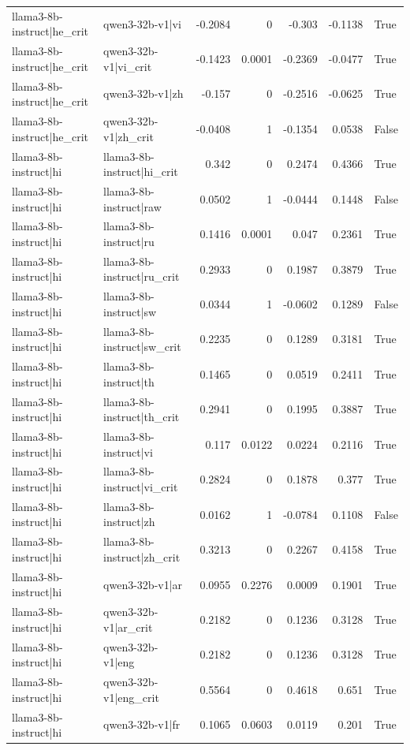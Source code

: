 \begin{table}
\begin{tabular}{l l r r r r l}
llama3-8b-instruct|he_crit & qwen3-32b-v1|vi & -0.2084 & 0 & -0.303 & -0.1138 & True \\
llama3-8b-instruct|he_crit & qwen3-32b-v1|vi_crit & -0.1423 & 0.0001 & -0.2369 & -0.0477 & True \\
llama3-8b-instruct|he_crit & qwen3-32b-v1|zh & -0.157 & 0 & -0.2516 & -0.0625 & True \\
llama3-8b-instruct|he_crit & qwen3-32b-v1|zh_crit & -0.0408 & 1 & -0.1354 & 0.0538 & False \\
llama3-8b-instruct|hi & llama3-8b-instruct|hi_crit & 0.342 & 0 & 0.2474 & 0.4366 & True \\
llama3-8b-instruct|hi & llama3-8b-instruct|raw & 0.0502 & 1 & -0.0444 & 0.1448 & False \\
llama3-8b-instruct|hi & llama3-8b-instruct|ru & 0.1416 & 0.0001 & 0.047 & 0.2361 & True \\
llama3-8b-instruct|hi & llama3-8b-instruct|ru_crit & 0.2933 & 0 & 0.1987 & 0.3879 & True \\
llama3-8b-instruct|hi & llama3-8b-instruct|sw & 0.0344 & 1 & -0.0602 & 0.1289 & False \\
llama3-8b-instruct|hi & llama3-8b-instruct|sw_crit & 0.2235 & 0 & 0.1289 & 0.3181 & True \\
llama3-8b-instruct|hi & llama3-8b-instruct|th & 0.1465 & 0 & 0.0519 & 0.2411 & True \\
llama3-8b-instruct|hi & llama3-8b-instruct|th_crit & 0.2941 & 0 & 0.1995 & 0.3887 & True \\
llama3-8b-instruct|hi & llama3-8b-instruct|vi & 0.117 & 0.0122 & 0.0224 & 0.2116 & True \\
llama3-8b-instruct|hi & llama3-8b-instruct|vi_crit & 0.2824 & 0 & 0.1878 & 0.377 & True \\
llama3-8b-instruct|hi & llama3-8b-instruct|zh & 0.0162 & 1 & -0.0784 & 0.1108 & False \\
llama3-8b-instruct|hi & llama3-8b-instruct|zh_crit & 0.3213 & 0 & 0.2267 & 0.4158 & True \\
llama3-8b-instruct|hi & qwen3-32b-v1|ar & 0.0955 & 0.2276 & 0.0009 & 0.1901 & True \\
llama3-8b-instruct|hi & qwen3-32b-v1|ar_crit & 0.2182 & 0 & 0.1236 & 0.3128 & True \\
llama3-8b-instruct|hi & qwen3-32b-v1|eng & 0.2182 & 0 & 0.1236 & 0.3128 & True \\
llama3-8b-instruct|hi & qwen3-32b-v1|eng_crit & 0.5564 & 0 & 0.4618 & 0.651 & True \\
llama3-8b-instruct|hi & qwen3-32b-v1|fr & 0.1065 & 0.0603 & 0.0119 & 0.201 & True \\

\end{tabular}
\end{table}
